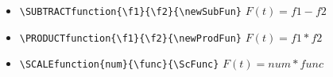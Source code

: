 \begin{itemize}
 \item \verb|\SUBTRACTfunction{\f1}{\f2}{\newSubFun}|
 $F(t)= f1 - f2$
 \item \verb|\PRODUCTfunction{\f1}{\f2}{\newProdFun}|
 $F(t)= f1 * f2$
 \item \verb|\SCALEfunction{num}{\func}{\ScFunc}|
 $F(t) = num * func$
\end{itemize}
